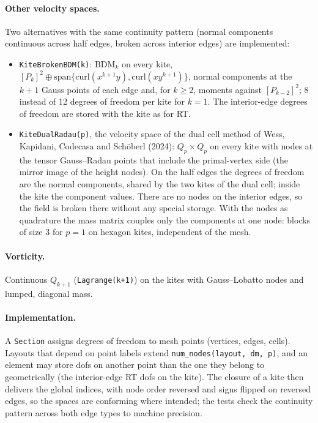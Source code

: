\documentclass[11pt,a4paper]{article}
\newcommand{\code}[1]{\texttt{#1}}
\begin{document}
\paragraph{Other velocity spaces.} Two alternatives with the same continuity
pattern (normal components continuous across half edges, broken across
interior edges) are implemented:
\begin{itemize}
\item \code{KiteBrokenBDM(k)}: $\mathrm{BDM}_k$ on every kite,
  $[P_k]^2\oplus\mathrm{span}\{\mathrm{curl}(x^{k+1}y),\mathrm{curl}(xy^{k+1})\}$,
  normal components at the $k+1$ Gauss points of each edge and, for $k\ge2$,
  moments against $[P_{k-2}]^2$; 8 instead of 12 degrees of freedom per kite for
  $k=1$. The interior-edge degrees of freedom are stored with the kite as for RT.
\item \code{KiteDualRadau(p)}, the velocity space of the dual cell method of Wess,
  Kapidani, Codecasa and Sch\"oberl (2024): $Q_p\times Q_p$ on every kite with nodes at
  the tensor Gauss--Radau points that include the primal-vertex side (the mirror
  image of the height nodes). On the half edges the degrees of freedom are the
  normal components, shared by the two kites of the dual cell; inside the kite the
  component values. There are no nodes on the interior edges, so the field is
  broken there without any special storage. With the nodes as quadrature the mass
  matrix couples only the components at one node: blocks of size 3 for $p=1$ on
  hexagon kites, independent of the mesh.
\end{itemize}

\paragraph{Vorticity.} Continuous $Q_{k+1}$ (\code{Lagrange(k+1)}) on the kites
with Gauss--Lobatto nodes and lumped, diagonal mass.

\paragraph{Implementation.} A \code{Section} assigns degrees of freedom to mesh
points (vertices, edges, cells). Layouts that depend on point labels extend
\code{num\_nodes(layout, dm, p)}, and an element may store dofs on another point
than the one they belong to geometrically (the interior-edge RT dofs on the
kite). The closure of a kite then delivers the global indices, with node order
reversed and signs flipped on reversed edges, so the spaces are conforming
where intended; the tests check the continuity pattern across both edge types
to machine precision.
\end{document}
